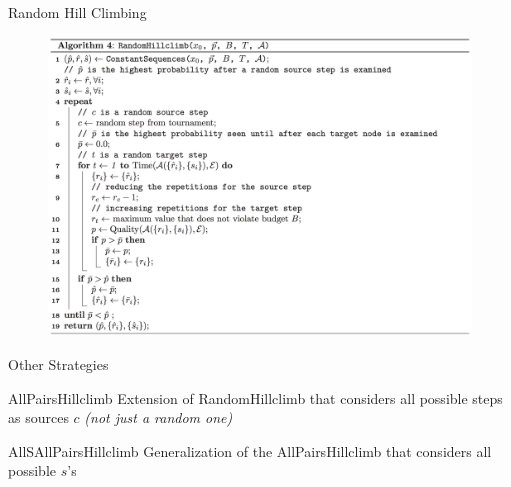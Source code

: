 \documentclass{beamer}
\begin{document}
\begin{frame}{Random Hill Climbing}

		\begin{figure}
			\centering
			\includegraphics[scale=0.28]{images/randomhill.png}
		\end{figure}	

\end{frame}

\begin{frame}{Other Strategies}

\begin{block}{AllPairsHillclimb}
 Extension of RandomHillclimb that considers all possible steps as sources $c$ \textit{(not just a random one)}
\end{block}

\vspace{5pt}

\begin{block}{AllSAllPairsHillclimb}
 Generalization of the AllPairsHillclimb that considers all possible $s$'s 
\end{block}

\end{frame}
\end{document}
